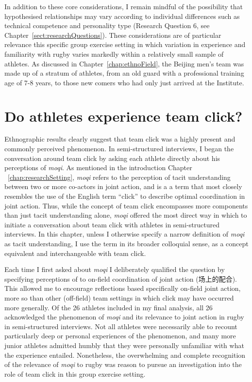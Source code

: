\begin{CJK}{UTF8}{gbsn}
In addition to these core considerations, I remain mindful of the possibility that hypothesised relationships may vary according to individual differences such as technical competence and personality type (Research Question 6, see Chapter~\ref{sect:researchQuestions}).  These considerations are of particular relevance this specific group exercise setting in which variation in experience and familiarity with rugby varies markedly within a relatively small sample of athletes.  As discussed in Chapter~\ref{chap:ethnoField}, the Beijing men's team was made up of a stratum of athletes, from an old guard with a professional training age of 7-8 years, to those new comers who had only just arrived at the Institute.



  \section{Do athletes experience team click?\label{sect:teamClickExperience}}
Ethnographic results clearly suggest that team click was a highly present and commonly perceived phenomenon.   In semi-structured interviews, I began the conversation around team click by asking each athlete directly about his perceptions of \textit{moqi}.  As mentioned in the introduction Chapter ~\ref{chap:researchSetting}, \textit{moqi} refers to the perception of tacit understanding between two or more co-actors in joint action, and is a a term that most closely resembles the use of the English term ``click'' to describe optimal coordination in joint action.  Thus, while the concept of team click encompasses more components than just tacit understanding alone, \textit{moqi} offered the most direct way in which to initiate a conversation about team click with athletes in semi-structured interviews.  In this chapter, unless I otherwise specify a narrow definition of \textit{moqi} as tacit understanding, I use the term in its broader colloquial sense, as a concept equivalent and interchangeable with team click.

Each time I first asked about \textit{moqi} I deliberately qualified the question by specifying perceptions of to on-field coordination of joint action (场上的配合).  This allowed me to encourage reflections based specifically on-field joint action, more so than other (off-field) team settings in which click may have occurred more generally.  Of the 26 athletes included in my final analysis, all 26 acknowledged the phenomenon of \textit{moqi} and its relevance to joint action in rugby in semi-structured interviews.  Not all athletes were necessarily able to recount particularly deep or personal experiences of the phenomenon, and many more junior athletes admitted humbly that they were personally unfamiliar with what the experience entailed.  Nonetheless, the overwhelming and complete recognition of the relevance of \textit{moqi} to rugby was reason to pursue an investigation into the role of team click in this group exercise setting.


\end{CJK}
